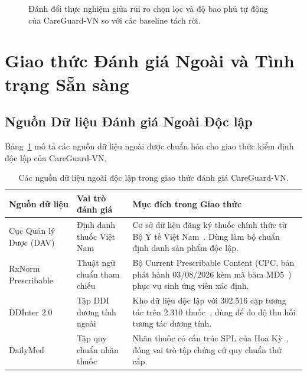 \documentclass[11pt]{article}
\begin{document}
\begin{figure}[h]
\centering
{}
\caption{Đánh đổi thực nghiệm giữa rủi ro chọn lọc và độ bao phủ tự động của CareGuard-VN so với các baseline tách rời.}
\label{fig:risk_coverage_analysis_vi}
\end{figure}

\section{Giao thức Đánh giá Ngoài và Tình trạng Sẵn sàng}

\subsection{Nguồn Dữ liệu Đánh giá Ngoài Độc lập}
Bảng~\ref{tab:sources_vi} mô tả các nguồn dữ liệu ngoài được chuẩn hóa cho giao thức kiểm định độc lập của CareGuard-VN.

\begin{table}[H]
\centering
\caption{Các nguồn dữ liệu ngoài độc lập trong giao thức đánh giá CareGuard-VN.}
\label{tab:sources_vi}
\small
\begin{tabularx}{\textwidth}{p{2.6cm}p{3.2cm}X}
\toprule
\textbf{Nguồn dữ liệu} & \textbf{Vai trò đánh giá} & \textbf{Mục đích trong Giao thức} \\
\midrule
Cục Quản lý Dược (DAV) & Định danh thuốc Việt Nam & Cơ sở dữ liệu đăng ký thuốc chính thức từ Bộ Y tế Việt Nam~\cite{dav2026}. Dùng làm bộ chuẩn định danh sản phẩm độc lập. \\
RxNorm Prescribable & Thuật ngữ chuẩn tham chiếu & Bộ Current Prescribable Content (CPC, bản phát hành 03/08/2026 kèm mã băm MD5~\cite{nlmrxnorm2026}) phục vụ sinh ứng viên xác định. \\
DDInter 2.0 & Tập DDI dương tính ngoài & Kho dữ liệu độc lập với 302.516 cặp tương tác trên 2.310 thuốc~\cite{tian2025ddinter,ddinterdownload2026}, dùng để đo độ thu hồi tương tác dương tính. \\
DailyMed & Tập quy chuẩn nhãn thuốc & Nhãn thuốc có cấu trúc SPL của Hoa Kỳ~\cite{dailymed2026}, đóng vai trò tập chứng cứ quy chuẩn thứ cấp. \\
\bottomrule
\end{tabularx}
\end{table}
\end{document}

